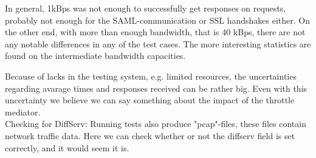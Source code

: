     In general, 1kBps was not enough to successfully get responses on requests, probably not enough for the SAML-communication or SSL handshakes either. On the other end, with more than enough bandwidth, that is 40 kBps, there are not any notable differences in any of the test cases. The more interesting statistics are found on the intermediate bandwidth capacities.

    Because of lacks in the testing system, e.g. limited resources, the uncertainties regarding avarage times and responses received can be rather big. Even with this uncertainty we believe we can say something about the impact of the throttle mediator. \\

    Checking for DiffServ: Running tests also produce "pcap"-files, these files contain network traffic data. Here we can check whether or not the diffserv field is set correctly, and it would seem it is. 
